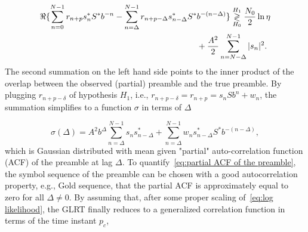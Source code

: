 \begin{equation}
    \label{eq:log likelihood}
    \begin{aligned}
    \Re\{\sum_{n=0}^{N-1}r_{n+p}s^*_nS^*b^{-n}-
    \sum_{n=\Delta}^{N-1}r_{n+p-\Delta}s^*_{n-\Delta}S^*&b^{-(n-\Delta)}\}
    \mathrel{\mathop\gtrless\limits^{H_1}_{H_0}} \frac{N_0}{2}\ln\eta \\
    &+\frac{A^2}{2}\sum_{n=N-\Delta}^{N-1}|s_n|^2.
    \end{aligned}
\end{equation}
The second summation on the left hand side points to the inner product of the overlap between
the observed (partial) preamble and the true preamble. 
By plugging $r_{n+p-\delta}$ of hypothesis $H_1$, i.e., $r_{n+p-\delta}=r_{n+p}=s_nSb^n+w_n$, the summation simplifies 
to a function $\sigma$ in terms of $\Delta$

\begin{equation}
    \label{eq:partial ACF of the preamble}
    \sigma(\Delta)=A^2b^{\Delta}\sum_{n=\Delta}^{N-1}s_ns^*_{n-\Delta}+\sum_{n=\Delta}^{N-1}w_ns^*_{n-\Delta}S^*b^{-(n-\Delta)},
\end{equation}
which is Gaussian distributed with mean given  "partial" auto-correlation function (ACF) of the preamble at lag $\Delta$.
To quantify~\eqref{eq:partial ACF of the preamble}, the symbol sequence of the preamble can be chosen with a good autocorrelation property,
e.g., Gold sequence, that the partial ACF is approximately equal to zero for all $\Delta \neq 0$. 
By assuming that, after some proper scaling of~\eqref{eq:log likelihood}, the GLRT finally reduces to 
a generalized correlation function in terms of the time instant $p_c$,

